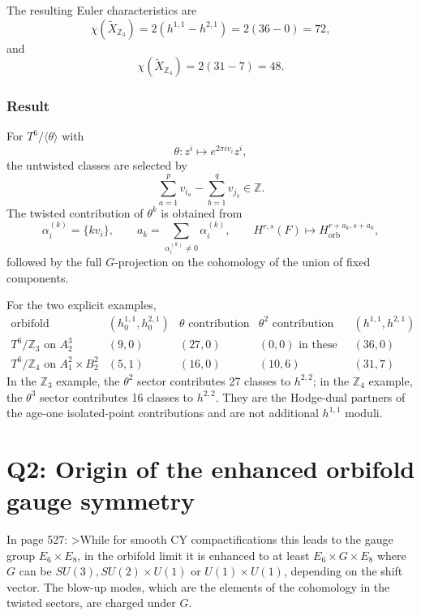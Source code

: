 \documentclass[
  10pt,
  a4paper,
  openany]{book}
\begin{document}
The resulting Euler characteristics are \[
\chi(\widetilde X_{\mathbb Z_3})
=2(h^{1,1}-h^{2,1})
=2(36-0)
=72,
\] and \[
\chi(\widetilde X_{\mathbb Z_4})
=2(31-7)
=48.
\]

\subsubsection{Result}\label{result-21}

For \(T^6/\langle\theta\rangle\) with \[
\theta:z^i\mapsto e^{2\pi i v_i}z^i,
\] the untwisted classes are selected by \[
\boxed{
\sum_{a=1}^p v_{i_a}
-
\sum_{b=1}^q v_{j_b}
\in\mathbb Z
}.
\] The twisted contribution of \(\theta^k\) is obtained from \[
\boxed{
\alpha_i^{(k)}=\{kv_i\},
\qquad
a_k=\sum_{\alpha_i^{(k)}\neq0}\alpha_i^{(k)},
\qquad
H^{r,s}(F)\mapsto H_{\mathrm{orb}}^{r+a_k,s+a_k}
},
\] followed by the full \(G\)-projection on the cohomology of the union
of fixed components.

For the two explicit examples, \[
\begin{array}{c|c|c|c|c}
\text{orbifold}
&
(h_0^{1,1},h_0^{2,1})
&
\theta\text{ contribution}
&
\theta^2\text{ contribution}
&
(h^{1,1},h^{2,1})
\\ \hline
T^6/\mathbb Z_3\text{ on }A_2^3
&
(9,0)
&
(27,0)
&
(0,0)\text{ in these bidegrees}
&
(36,0)
\\
T^6/\mathbb Z_4\text{ on }A_1^2\times B_2^2
&
(5,1)
&
(16,0)
&
(10,6)
&
(31,7)
\end{array}
\] In the \(\mathbb Z_3\) example, the \(\theta^2\) sector contributes
27 classes to \(h^{2,2}\); in the \(\mathbb Z_4\) example, the
\(\theta^3\) sector contributes 16 classes to \(h^{2,2}\). They are the
Hodge-dual partners of the age-one isolated-point contributions and are
not additional \(h^{1,1}\) moduli.

\section{Q2: Origin of the enhanced orbifold gauge
symmetry}\label{q2-origin-of-the-enhanced-orbifold-gauge-symmetry}

In page 527: \textgreater While for smooth CY compactifications this
leads to the gauge group \(E_{6}\times E_{8}\), in the orbifold limit it
is enhanced to at least \(E_{6}\times G\times E_{8}\) where \(G\) can be
\(SU(3),SU(2)\times U(1)\) or \(U(1)\times U(1)\), depending on the
shift vector. The blow-up modes, which are the elements of the
cohomology in the twisted sectors, are charged under \(G\).
\end{document}
